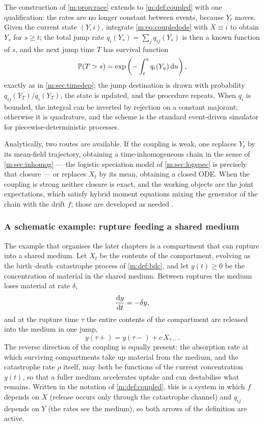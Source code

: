 The construction of \cref{m:prop:race} extends to \cref{m:def:coupled} with one
qualification: the rates are no longer constant between events, because $Y_t$
moves. Given the current state $(Y,i)$, integrate \cref{m:eq:coupledode} with
$X\equiv i$ to obtain $Y_s$ for $s\ge t$; the total jump rate
$q_i(Y_s)=\sum_jq_{ij}(Y_s)$ is then a known function of $s$, and the next jump
time $T$ has survival function
\begin{equation*}
\mathbb{P}\!\left(T>s\right) = \exp\left(-\int_t^{s}q_i(Y_u)\,\mathrm{d} u\right),
\end{equation*}
exactly as in \cref{m:sec:timedep}; the jump destination is drawn with
probability $q_{ij}(Y_T)/q_i(Y_T)$, the state is updated, and the procedure
repeats. When $q_i$ is bounded, the integral can be inverted by rejection on a
constant majorant; otherwise it is quadrature, and the scheme is the standard
event-driven simulator for piecewise-deterministic processes.

Analytically, two routes are available. If the coupling is weak, one replaces
$Y_t$ by its mean-field trajectory, obtaining a time-inhomogeneous chain in the
sense of \cref{m:sec:inhomog} --- the logistic speciation model of
\cref{m:sec:logspec} is precisely that closure --- or replaces $X_t$ by its
mean, obtaining a closed ODE. When the coupling is strong neither closure is
exact, and the working objects are the joint expectations, which satisfy hybrid
moment equations mixing the generator of the chain with the drift $f$; those are
developed as needed .

\subsubsection{A schematic example: rupture feeding a shared medium}
\label{m:sec:coupledexample}

The example that organises the later chapters is a compartment that can rupture
into a shared medium. Let $X_t$ be the contents of the compartment, evolving as
the birth--death--catastrophe process of \cref{m:def:bdc}, and let $y(t)\ge0$
be the concentration of material in the shared medium. Between ruptures the
medium loses material at rate $\delta$,
\begin{equation*}
\frac{\mathrm{d} y}{\mathrm{d} t} = -\delta y ,
\end{equation*}
and at the rupture time $\tau$ the entire contents of the compartment are
released into the medium in one jump,
\begin{equation*}
y(\tau+) = y(\tau-) + c\,X_{\tau-} .
\end{equation*}
The reverse direction of the coupling is equally present: the absorption rate at
which surviving compartments take up material from the medium, and the
catastrophe rate $\rho$ itself, may both be functions of the current
concentration $y(t)$, so that a fuller medium accelerates uptake and can
destabilise what remains. Written in the notation of \cref{m:def:coupled}, this
is a system in which $f$ depends on $X$ (release occurs only through the
catastrophe channel) and $q_{ij}$ depends on $Y$ (the rates see the medium), so
both arrows of the definition are active.

